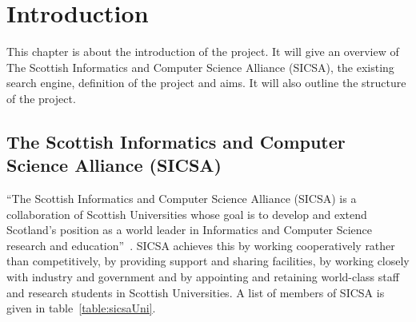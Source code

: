 


\chapter{Introduction}

This chapter is about the introduction of the project. It will give an overview of The Scottish Informatics and Computer Science Alliance (SICSA), 
the existing search engine, definition of the project and aims. It will also outline the structure of the project.

\section{The Scottish Informatics and Computer Science Alliance (SICSA)}\label{sec:whatissicsa}

``The Scottish Informatics and Computer Science Alliance (SICSA) is a collaboration of Scottish Universities whose goal is to develop 
and extend Scotland's position as a world leader in Informatics and Computer Science research and education''~\cite{sicsa}. 
SICSA achieves this by working cooperatively rather than competitively, by providing support and sharing facilities, by working closely 
with industry and government and by appointing and retaining world-class staff and research students in Scottish Universities.
A list of members of SICSA is given in table~\ref{table:sicsaUni}.
\begin{table}
\centering
{} 
\caption{A list of members of SICSA} \label{table:sicsaUni}
\end{table}
